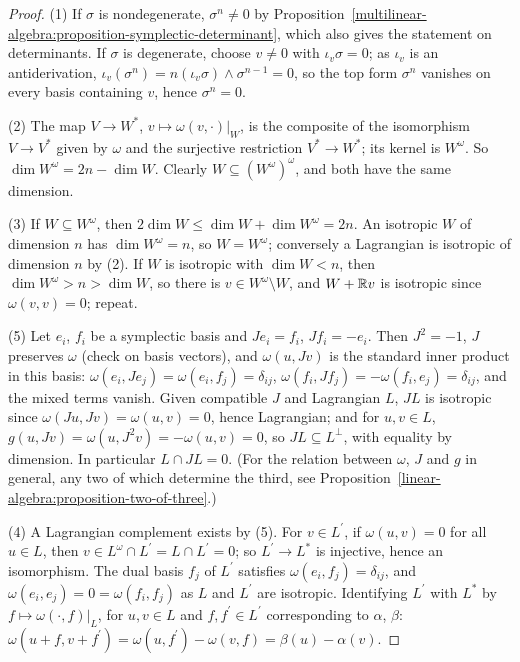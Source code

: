 \begin{proof}
(1) If $\sigma$ is nondegenerate, $\sigma^n \neq 0$ by Proposition~\ref{multilinear-algebra:proposition-symplectic-determinant}, which also gives the statement on determinants. If $\sigma$ is degenerate,
choose $v \neq 0$ with $\iota_v\sigma = 0$; as $\iota_v$ is an antiderivation, $\iota_v(\sigma^n) = n(\iota_v\sigma) \wedge \sigma^{n-1} = 0$, so the top form $\sigma^n$ vanishes on every basis containing $v$,
hence $\sigma^n = 0$.

(2) The map $V \to W^*$, $v \mapsto \omega(v, \cdot)|_W$, is the composite of the isomorphism $V \to V^*$ given by $\omega$ and the surjective restriction $V^* \to W^*$; its kernel is $W^\omega$. So
$\dim W^\omega = 2n - \dim W$. Clearly $W \subseteq (W^\omega)^\omega$, and both have the same dimension.

(3) If $W \subseteq W^\omega$, then $2\dim W \leq \dim W + \dim W^\omega = 2n$. An isotropic $W$ of dimension $n$ has $\dim W^\omega = n$, so $W = W^\omega$; conversely a Lagrangian is isotropic of dimension
$n$ by (2). If $W$ is isotropic with $\dim W < n$, then $\dim W^\omega > n > \dim W$, so there is $v \in W^\omega \setminus W$, and $W + \mathbb{R} v$ is isotropic since $\omega(v, v) = 0$; repeat.

(5) Let $e_i$, $f_i$ be a symplectic basis and $Je_i = f_i$, $Jf_i = -e_i$. Then $J^2 = -1$, $J$ preserves $\omega$ (check on basis vectors), and $\omega(u, Jv)$ is the standard inner product in this basis:
$\omega(e_i, Je_j) = \omega(e_i, f_j) = \delta_{ij}$, $\omega(f_i, Jf_j) = -\omega(f_i, e_j) = \delta_{ij}$, and the mixed terms vanish. Given compatible $J$ and Lagrangian $L$, $JL$ is isotropic since
$\omega(Ju, Jv) = \omega(u, v) = 0$, hence Lagrangian; and for $u, v \in L$, $g(u, Jv) = \omega(u, J^2v) = -\omega(u, v) = 0$, so $JL \subseteq L^\perp$, with equality by dimension. In particular
$L \cap JL = 0$. (For the relation between $\omega$, $J$ and $g$ in general, any two of which determine the third, see
Proposition~\ref{linear-algebra:proposition-two-of-three}.)

(4) A Lagrangian complement exists by (5). For $v \in L^{\prime}$, if $\omega(u, v) = 0$ for all $u \in L$, then $v \in L^\omega \cap L^{\prime} = L \cap L^{\prime} = 0$; so $L^{\prime} \to L^*$ is injective, hence an isomorphism.
The dual basis $f_j$ of $L^{\prime}$ satisfies $\omega(e_i, f_j) = \delta_{ij}$, and $\omega(e_i, e_j) = 0 = \omega(f_i, f_j)$ as $L$ and $L^{\prime}$ are isotropic. Identifying $L^{\prime}$ with $L^*$ by
$f \mapsto \omega(\cdot, f)|_L$, for $u, v \in L$ and $f, f^{\prime} \in L^{\prime}$ corresponding to $\alpha$, $\beta$: $\omega(u + f, v + f^{\prime}) = \omega(u, f^{\prime}) - \omega(v, f) = \beta(u) - \alpha(v)$.
\end{proof}

